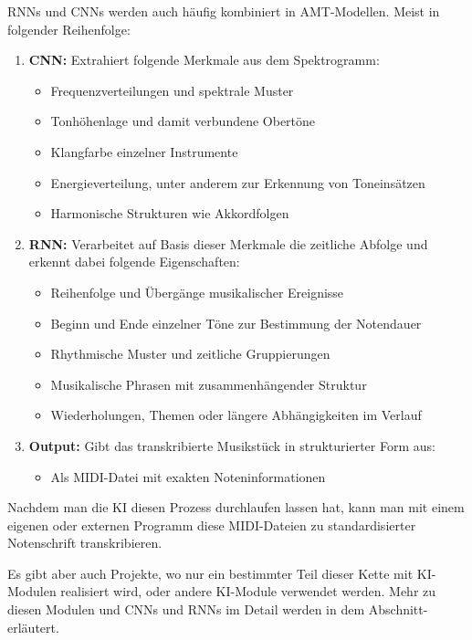RNNs und CNNs werden auch häufig kombiniert in AMT-Modellen.
Meist in folgender Reihenfolge:
\begin{enumerate}
    \item \textbf{CNN:} Extrahiert folgende Merkmale aus dem Spektrogramm:
    \begin{itemize}
        \item Frequenzverteilungen und spektrale Muster
        \item Tonhöhenlage und damit verbundene Obertöne
        \item Klangfarbe einzelner Instrumente
        \item Energieverteilung, unter anderem zur Erkennung von Toneinsätzen
        \item Harmonische Strukturen wie Akkordfolgen
    \end{itemize}

    \item \textbf{RNN:} Verarbeitet auf Basis dieser Merkmale die zeitliche Abfolge und erkennt dabei folgende Eigenschaften:
    \begin{itemize}
        \item Reihenfolge und Übergänge musikalischer Ereignisse
        \item Beginn und Ende einzelner Töne zur Bestimmung der Notendauer
        \item Rhythmische Muster und zeitliche Gruppierungen
        \item Musikalische Phrasen mit zusammenhängender Struktur
        \item Wiederholungen, Themen oder längere Abhängigkeiten im Verlauf
    \end{itemize}

    \item \textbf{Output:} Gibt das transkribierte Musikstück in strukturierter Form aus:
    \begin{itemize}
        \item Als MIDI-Datei mit exakten Noteninformationen
    \end{itemize}
\end{enumerate}
Nachdem man die KI diesen Prozess durchlaufen lassen hat, kann man mit einem eigenen oder externen Programm
diese MIDI-Dateien zu standardisierter Notenschrift transkribieren.

Es gibt aber auch Projekte, wo nur ein bestimmter Teil dieser Kette mit KI-Modulen realisiert wird,
oder andere KI-Module verwendet werden.
Mehr zu diesen Modulen und CNNs und RNNs im Detail werden in dem Abschnitt- erläutert.

